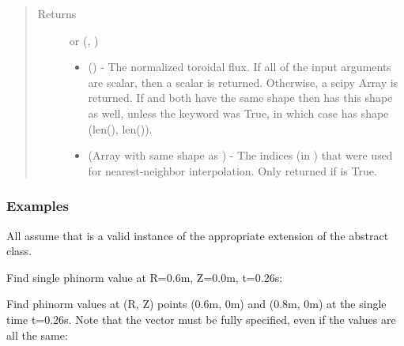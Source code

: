 \documentclass[letterpaper,10pt,english]{sphinxmanual}
\begin{document}
\begin{fulllineitems}
\begin{fulllineitems}
\begin{quote}
\begin{description}
\begin{itemize}
\end{itemize}

\item[{Returns}] \leavevmode

 or (, )
\begin{itemize}
\item {} 
 () - The normalized toroidal
flux. If all of the input arguments are scalar, then a scalar is
returned. Otherwise, a scipy Array is returned. If  and 
both have the same shape then  has this shape as well,
unless the  keyword was True, in which case 
has shape (len(), len()).

\item {} 
 (Array with same shape as ) - The indices
(in ) that were used for
nearest-neighbor interpolation. Only returned if  is
True.

\end{itemize}


\end{description}\end{quote}
\subsubsection*{Examples}

All assume that  is a valid instance of the appropriate
extension of the {\hyperref[\detokenize{eqtools:eqtools.core.Equilibrium}]{}} abstract class.

Find single phinorm value at R=0.6m, Z=0.0m, t=0.26s:

\begin{sphinxVerbatim}[commandchars=\\\{\}]
    
\end{sphinxVerbatim}

Find phinorm values at (R, Z) points (0.6m, 0m) and (0.8m, 0m) at the
single time t=0.26s. Note that the  vector must be fully specified,
even if the values are all the same:


\end{fulllineitems}
\end{fulllineitems}
\end{document}
